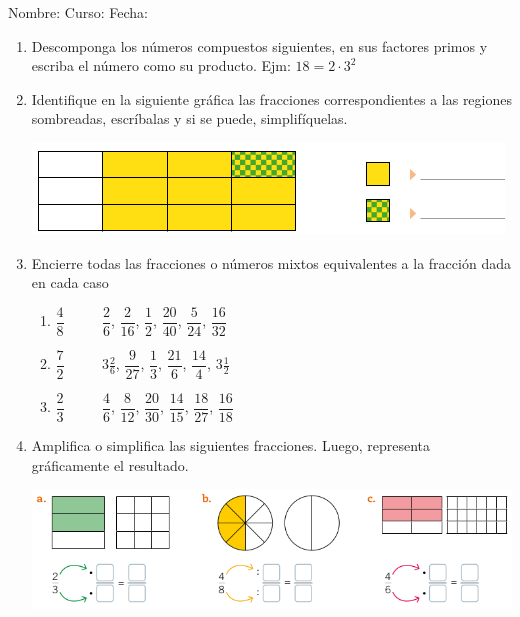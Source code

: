 \documentclass[fleqn]{article}
\newcommand{\LineaNombre}{%
\par
\vspace{\baselineskip}
Nombre:\hrulefill \; Curso: \underline{\hspace*{48pt}} \; Fecha: \underline{\hspace*{2.5cm}} \relax
\par}
\begin{document}
\LineaNombre
\begin{enumerate}
 \item Descomponga los números compuestos siguientes, en sus factores primos y escriba el número como su producto. Ejm: $18=2\cdot 3^{2}$
 \begin{enumerate}
 \end{enumerate}
 \noanswer
 \item Identifique en la siguiente gráfica las fracciones correspondientes a las regiones sombreadas, escríbalas y si se puede, simplifíquelas.
   \begin{center}
     \includegraphics[scale=.6]{Images/fraccion.png}
   \end{center}
   \noanswer[.25in]
 \item Encierre todas las fracciones o números mixtos equivalentes a la fracción dada en cada caso
 \begin{enumerate}
 \item $\dfrac{4}{8}$ $\qquad$ $\dfrac{2}{6}$, $\dfrac{2}{16}$, $\dfrac{1}{2}$, $\dfrac{20}{40}$, $\dfrac{5}{24}$, $\dfrac{16}{32}$
 \newpage
 \item $\dfrac{7}{2}$ $\qquad$ $3\frac{2}{6}$, $\dfrac{9}{27}$, $\dfrac{1}{3}$, $\dfrac{21}{6}$, $\dfrac{14}{4}$, $3\frac{1}{2}$\noanswer[.1in]
 \item $\dfrac{2}{3}$ $\qquad$ $\dfrac{4}{6}$, $\dfrac{8}{12}$, $\dfrac{20}{30}$, $\dfrac{14}{15}$, $\dfrac{18}{27}$, $\dfrac{16}{18}$ \noanswer[.1in]
 \end{enumerate}
  \item Amplifica o simplifica las siguientes fracciones. Luego, representa gráficamente el resultado.
\begin{center}
 \includegraphics[scale=.4]{Images/AmpSimpFracc.png} 

\end{center}
\end{enumerate}
\end{document}
